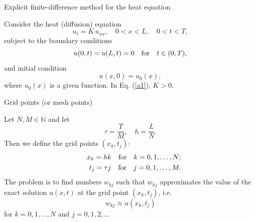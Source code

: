 \documentclass{beamer}
\begin{document}



\begin{frame}{Explicit finite-difference method for the heat equation}

\noindent
Consider the heat (diffusion) equation
\begin{equation}
u_{t} = K \, u_{xx}, \quad
0<x< L, \quad 0 < t < T,   \label{a1}
\end{equation}
subject to the boundary conditions
\begin{equation}
u(0, t) = u(L, t)=0 \quad \hbox{for} \quad t\in (0,T),   \label{a2}
\end{equation}
and initial condition
\begin{equation}
u(x, 0) = u_{0}(x),   \label{a3}
\end{equation}
where $u_{0}(x)$ is a given function. In Eq. (\ref{a1}), $K>0$.

\end{frame}



\begin{frame}{Grid points (or mesh points)}

Let $N,M\in\mathbb{N}$ and let
\[
\tau=\frac{T}{M}, \quad h=\frac{L}{N}.
\]
Then we define the grid points $(x_{k}, t_{j})$:
\begin{eqnarray}
&&x_{k}=hk \quad {\rm for} \quad k=0,1,\dots,N; \nonumber \\
&&t_{j}=\tau j \quad {\rm for} \quad j=0,1,\dots,M. \nonumber
\end{eqnarray}
The problem is to find numbers $w_{kj}$
such that $w_{kj}$ approximates the value of the exact solution
$u(x,t)$ at the grid point $(x_{k}, t_{j})$, i.e.
\[
w_{kj}\approx u(x_{k}, t_{j})
\]
for $k=0,1,\dots,N$ and $j=0,1,2,\dots$



\end{frame}

\end{document}
